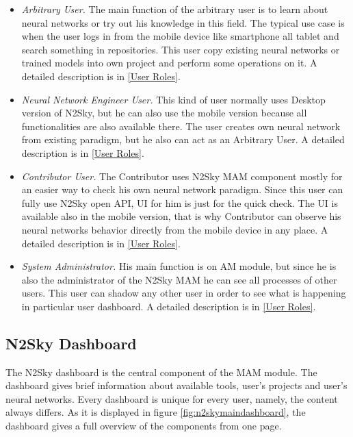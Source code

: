 \begin{itemize}
\item \emph{Arbitrary User.} The main function of the arbitrary user is to learn about neural networks or try out his knowledge in this field. The typical use case is when the user logs in from the mobile device like smartphone all tablet and search something in repositories. This user copy existing neural networks or trained models into own project and perform some operations on it.  A detailed description is in \autoref{User Roles}. 
\item \emph{Neural Network Engineer User.} This kind of user normally uses Desktop version of N2Sky, but he can also use the mobile version because all functionalities are also available there. The user creates own neural network from existing paradigm, but he also can act as an Arbitrary User.  A detailed description is in \autoref{User Roles}. 
\item \emph{Contributor User.} The Contributor uses N2Sky MAM component mostly for an easier way to check his own neural network paradigm. Since this user can fully use N2Sky open API, UI for him is just for the quick check. The UI is available also in the mobile version, that is why Contributor can observe his neural networks behavior directly from the mobile device in any place. A detailed description is in \autoref{User Roles}. 
\item \emph{System Administrator.} His main function is on AM module, but since he is also the administrator of the N2Sky MAM he can see all processes of other users. This user can shadow any other user in order to see what is happening in particular user dashboard.  A detailed description is in \autoref{User Roles}. 
\end{itemize}

\subsection{N2Sky Dashboard}\label{N2Sky Dashboard}
The N2Sky dashboard is the central component of the MAM module. The dashboard gives brief information about available tools, user's projects and user's neural networks. Every dashboard is unique for every user, namely, the content always differs. As it is displayed in figure \ref{fig:n2skymaindashboard}, the dashboard gives a full overview of the components from one page.

